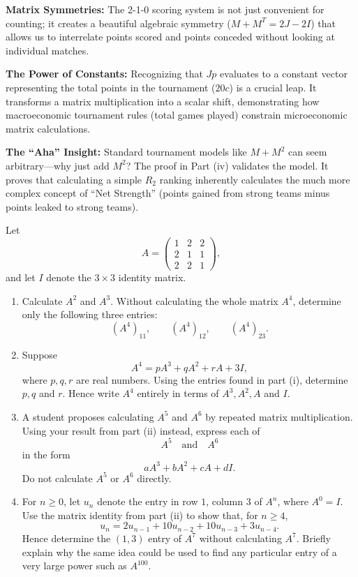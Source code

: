 \begin{takeaways}
    \item \textbf{Matrix Symmetries:} The 2-1-0 scoring system is not just convenient for counting; it creates a beautiful algebraic symmetry ($M + M^T = 2J - 2I$) that allows us to interrelate points scored and points conceded without looking at individual matches. 
    \item \textbf{The Power of Constants:} Recognizing that $Jp$ evaluates to a constant vector representing the total points in the tournament ($20c$) is a crucial leap. It transforms a matrix multiplication into a scalar shift, demonstrating how macroeconomic tournament rules (total games played) constrain microeconomic matrix calculations.
    \item \textbf{The ``Aha'' Insight:} Standard tournament models like $M + M^2$ can seem arbitrary—why just add $M^2$? The proof in Part (iv) validates the model. It proves that calculating a simple $R_2$ ranking inherently calculates the much more complex concept of ``Net Strength'' (points gained from strong teams minus points leaked to strong teams). 
\end{takeaways}

\begin{problem}
Let \[ A= \begin{pmatrix} 1&2&2\\ 2&1&1\\ 2&2&1 \end{pmatrix}, \] and let \(I\) denote the \(3\times 3\) identity matrix. 
\begin{enumerate} 
\item[(i)] Calculate \(A^2\) and \(A^3\). Without calculating the whole matrix \(A^4\), determine only the following three entries: \[ (A^4)_{11},\qquad (A^4)_{12},\qquad (A^4)_{23}. \] 
\item[(ii)] Suppose \[ A^4=pA^3+qA^2+rA+3I, \] where \(p,q,r\) are real numbers. Using the entries found in part (i), determine \(p,q\) and \(r\). Hence write \(A^4\) entirely in terms of \(A^3,A^2,A\) and \(I\). 
\item[(iii)] A student proposes calculating \(A^5\) and \(A^6\) by repeated matrix multiplication. Using your result from part (ii) instead, express each of \[ A^5 \quad\text{and}\quad A^6 \] in the form \[ aA^3+bA^2+cA+dI. \] Do not calculate \(A^5\) or \(A^6\) directly. 
\item[(iv)] For \(n\geq0\), let \(u_n\) denote the entry in row \(1\), column \(3\) of \(A^n\), where \(A^0=I\). Use the matrix identity from part (ii) to show that, for \(n\geq4\), \[ u_n = 2u_{n-1} +10u_{n-2} +10u_{n-3} +3u_{n-4}. \] Hence determine the \((1,3)\) entry of \(A^7\) without calculating \(A^7\). Briefly explain why the same idea could be used to find any particular entry of a very large power such as \(A^{100}\). 
\end{enumerate}
\end{problem}

